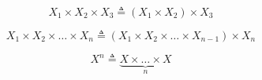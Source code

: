\begin{frame}{}
  \begin{definition}
    \[
      X_{1} \times X_{2} \times X_{3} \triangleq (X_{1} \times X_{2}) \times X_{3}
    \]

    \pause
    \[
      X_{1} \times X_{2} \times \dots \times X_{n}
        \triangleq (X_{1} \times X_{2} \times \dots \times X_{n-1}) \times X_{n}
    \]
  \end{definition}

  \pause
  \vspace{0.60cm}
  \[
    X^{n} \triangleq \underbrace{X \times \dots \times X}_{n}
  \]
\end{frame}

\begin{frame}{}
\end{frame}
